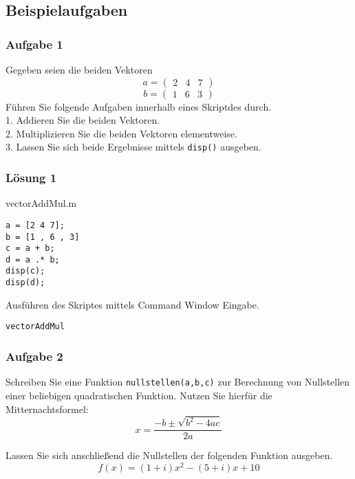         \subsection{Beispielaufgaben}
        \subsubsection*{Aufgabe 1}
        Gegeben seien die beiden Vektoren 
        \[a=\begin{pmatrix}
                2 & 4 & 7
        \end{pmatrix}\]
        \[b=\begin{pmatrix}
                1 & 6 & 3
        \end{pmatrix}\]
        Führen Sie folgende Aufgaben innerhalb eines Skriptdes durch.\\
        1. Addieren Sie die beiden Vektoren.\\
        2. Multiplizieren Sie die beiden Vektoren elementweise.\\
        3. Lassen Sie sich beide Ergebnisse mittels \texttt{disp()} ausgeben.
        \subsubsection*{Lösung 1}
        \begin{Codelösung}{vectorAddMul.m}
                \begin{lstlisting}
a = [2 4 7];
b = [1 , 6 , 3]
c = a + b;
d = a .* b;
disp(c);
disp(d);
                \end{lstlisting}
        \end{Codelösung}
        \noindent Ausführen des Skriptes mittels Command Window Eingabe.
        \begin{center}
                \texttt{vectorAddMul}
        \end{center}
        \subsubsection*{Aufgabe 2}
        Schreiben Sie eine Funktion \texttt{nullstellen(a,b,c)} zur Berechnung von Nullstellen einer beliebigen quadratischen Funktion. Nutzen Sie hierfür die Mitternachtsformel:
        \[x = \frac{-b\pm \sqrt{b^2-4ac}}{2a}\]

        \noindent Lassen Sie sich anschließend die Nullstellen der folgenden Funktion ausgeben.
        \[ f(x) = (1+i)x^2 - (5+i)x + 10\]
